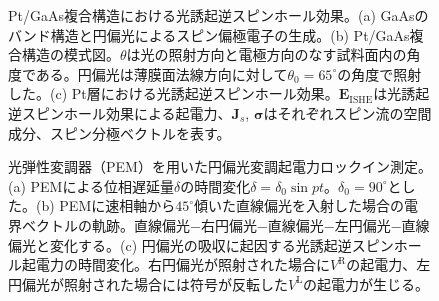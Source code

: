 \begin{figure}[tbp]
\begin{center}
\caption{Pt/GaAs複合構造における光誘起逆スピンホール効果。(a) GaAsのバンド構造と円偏光によるスピン偏極電子の生成。(b) Pt/GaAs複合構造の模式図。$\theta$は光の照射方向と電極方向のなす試料面内の角度である。円偏光は薄膜面法線方向に対して$\theta_0=65^\circ$の角度で照射した。(c) Pt層における光誘起逆スピンホール効果。$\bm{E}_\text{ISHE}$は光誘起逆スピンホール効果による起電力、$\bm{J}_s$, $\bm{\sigma}$はそれぞれスピン流の空間成分、スピン分極ベクトルを表す。}
\label{PISHE} 
\end{center}
\end{figure}

\begin{figure}[tbp]
\begin{center}
\caption{光弾性変調器（PEM）を用いた円偏光変調起電力ロックイン測定。(a) PEMによる位相遅延量$\delta$の時間変化$\delta=\delta_0\sin pt$。$\delta_0=90^\circ$とした。(b) PEMに速相軸から$45^\circ$傾いた直線偏光を入射した場合の電界ベクトルの軌跡。直線偏光−右円偏光−直線偏光−左円偏光−直線偏光と変化する。(c) 円偏光の吸収に起因する光誘起逆スピンホール起電力の時間変化。右円偏光が照射された場合に$V^\text{R}$の起電力、左円偏光が照射された場合には符号が反転した$V^\text{L}$の起電力が生じる。
}
\label{PEM_V} 
\end{center}
\end{figure}



